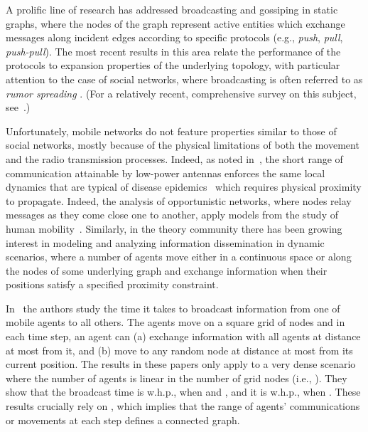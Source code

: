 \documentclass[11pt]{article}
\begin{document}
A prolific line of research has addressed broadcasting and gossiping
in static graphs, where the nodes of the graph represent active
entities which exchange messages along incident edges according to
specific protocols (e.g., \emph{push}, \emph{pull}, \emph{push-pull}).
The most recent results in this area relate the performance of the
protocols to expansion properties of the underlying topology, with
particular attention to the case of social networks, where
broadcasting is often referred to as \emph{rumor spreading}
\cite{ChierichettiLP10}.  (For a relatively recent, comprehensive
survey on this subject, see~\cite{HromkovicKPRU05}.)

Unfortunately, mobile networks do not feature
properties similar to those of social networks,
mostly because of the physical limitations
of both the movement and the radio transmission processes.
Indeed, as noted in~\cite{Kleinberg07},
the short range of communication attainable
by low-power antennas enforces the same local dynamics
that are typical of disease epidemics~\cite{Durrett99}
which requires physical proximity to propagate.
Indeed, the analysis of opportunistic networks,
where nodes relay messages as they come
close one to another, apply models 
from the study of human mobility~\cite{ChaintreauHCDGS07, Chaintreau08}.
Similarly, in the theory community there has been growing
interest in modeling and analyzing information dissemination in dynamic scenarios,
where a number of agents move either in a continuous space or along
the nodes of some underlying graph and exchange information when their
positions satisfy a specified proximity constraint.

In~\cite{ClementiMPS09,ClementiPS09} the authors study the time it takes
to broadcast information from one of  mobile agents to all others.
The agents move on a square grid of  nodes and in each time step,
an agent can (a) exchange information with all agents at distance at
most  from it, and (b) move to any random node at distance at most
 from its current position. The results in these papers only
apply to a very dense scenario where the number of agents is linear in
the number of grid nodes (i.e., ).  They show that the
broadcast time is  w.h.p., when 
and  \cite{ClementiMPS09}, and it is
 w.h.p., when  \cite{ClementiPS09}.  These results
crucially rely on , which implies that
the range of agents' communications or movements at each step defines
a connected graph.
\end{document}
